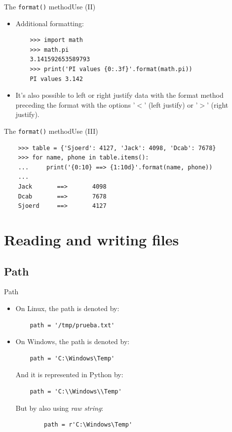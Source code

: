 \documentclass[10pt,compress]{beamer} %
\begin{document}
\begin{frame}[fragile]{The \texttt{format()} method}{Use (II)}
\begin{itemize}
\item Additional formatting:
	\begin{verbatim}
	>>> import math
	>>> math.pi
	3.141592653589793
	>>> print('PI values {0:.3f}'.format(math.pi))
	PI values 3.142
	\end{verbatim}
\item It's also possible to left or right justify data with the format method preceding the format with the options '$<$' (left justify) or '$>$' (right justify).\\
\end{itemize}
\end{frame}

\begin{frame}[fragile]{The \texttt{format()} method}{Use (III)}
	\begin{verbatim}
	>>> table = {'Sjoerd': 4127, 'Jack': 4098, 'Dcab': 7678}
	>>> for name, phone in table.items():
	...     print('{0:10} ==> {1:10d}'.format(name, phone))
	... 
	Jack       ==>       4098
	Dcab       ==>       7678
	Sjoerd     ==>       4127
	\end{verbatim}

\end{frame}

\section{Reading and writing files}

\subsection{Path}
\begin{frame}[fragile]{Path}{}
\begin{itemize}
	\item On Linux, the path is denoted by: \\
	\begin{verbatim}
	path = '/tmp/prueba.txt'
	\end{verbatim}
	\item On Windows, the path is denoted by: \\
	\begin{verbatim}
	path = 'C:\Windows\Temp'
	\end{verbatim}
	And it is represented  in Python by:\\
	\begin{verbatim}
	path = 'C:\\Windows\\Temp'
	\end{verbatim}
	But by also using \textit{raw string}:
	\begin{verbatim}
		path = r'C:\Windows\Temp'
	\end{verbatim}
\end{itemize}
\end{frame}
\end{document}
